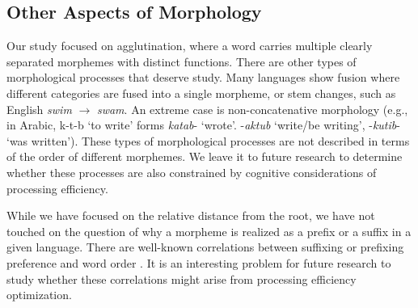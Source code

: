 \documentclass[11pt,letterpaper]{article}
\newcommand{\citep}{\parencite}
\begin{document}












\subsection{Other Aspects of Morphology}

Our study focused on agglutination, where a word carries multiple clearly separated morphemes with distinct functions.
There are other types of morphological processes that deserve study.
Many languages show fusion \citep{wals-20} where different categories are fused into a single morpheme, or stem changes, such as English \textit{swim} $\rightarrow$ \textit{swam}.
An extreme case is non-concatenative morphology (e.g., in Arabic, k-t-b `to write' forms \textit{katab}- `wrote'. -\textit{aktub} `write/be writing', -\textit{kutib}- `was written').
These types of morphological processes are not described in terms of the order of different morphemes.
We leave it to future research to determine whether these processes are also constrained by cognitive considerations of processing efficiency.

While we have focused on the relative distance from the root, we have not touched on the question of why a morpheme is realized as a prefix or a suffix in a given language.
There are well-known correlations between suffixing or prefixing preference and word order \citep{greenberg1963universals}.
It is an interesting problem for future research to study whether these correlations might arise from processing efficiency optimization.
\end{document}

